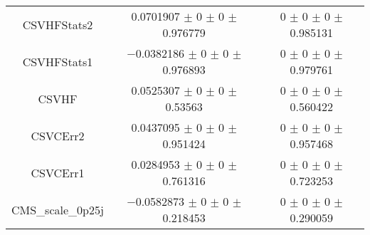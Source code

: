 \begin{table}
\begin{tabular}{ccc}
CSVHFStats2 	& \num{0.0701907} $\pm$ \num{0} $\pm$ \num{0} $\pm$ \num{0.976779} 	& \num{0} $\pm$ \num{0} $\pm$ \num{0} $\pm$ \num{0.985131}\\
CSVHFStats1 	& \num{-0.0382186} $\pm$ \num{0} $\pm$ \num{0} $\pm$ \num{0.976893} 	& \num{0} $\pm$ \num{0} $\pm$ \num{0} $\pm$ \num{0.979761}\\
CSVHF 	& \num{0.0525307} $\pm$ \num{0} $\pm$ \num{0} $\pm$ \num{0.53563} 	& \num{0} $\pm$ \num{0} $\pm$ \num{0} $\pm$ \num{0.560422}\\
CSVCErr2 	& \num{0.0437095} $\pm$ \num{0} $\pm$ \num{0} $\pm$ \num{0.951424} 	& \num{0} $\pm$ \num{0} $\pm$ \num{0} $\pm$ \num{0.957468}\\
CSVCErr1 	& \num{0.0284953} $\pm$ \num{0} $\pm$ \num{0} $\pm$ \num{0.761316} 	& \num{0} $\pm$ \num{0} $\pm$ \num{0} $\pm$ \num{0.723253}\\
CMS\_scale\_0p25j 	& \num{-0.0582873} $\pm$ \num{0} $\pm$ \num{0} $\pm$ \num{0.218453} 	& \num{0} $\pm$ \num{0} $\pm$ \num{0} $\pm$ \num{0.290059}\\
\bottomrule
\end{tabular}
\end{table}